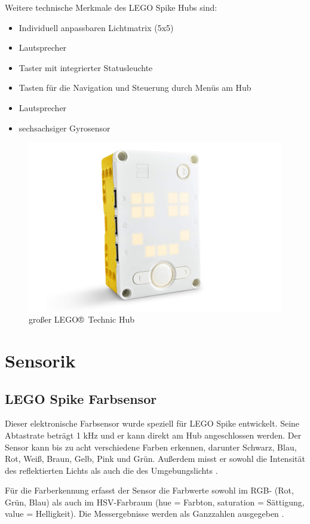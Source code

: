 Weitere technische Merkmale des LEGO Spike Hubs sind:
\begin{itemize}
	\item Individuell anpassbaren Lichtmatrix (5x5)
	\item Lautsprecher
	\item Taster mit integrierter Statusleuchte 
	\item Tasten für die Navigation und Steuerung durch Menüs am Hub 
	\item Lautsprecher
	\item sechsachsiger Gyrosensor 
\end{itemize} 

\begin{figure}[H]
	\centering
	\includegraphics[width=0.75\linewidth]{images/Hub}
	\caption{großer LEGO® Technic Hub}
	\label{fig:hub}
\end{figure}

\section{Sensorik}
\subsection{LEGO Spike Farbsensor}
Dieser elektronische Farbsensor wurde speziell für LEGO Spike entwickelt. Seine Abtastrate beträgt 1 kHz und er kann direkt am Hub angeschlossen werden. Der Sensor kann bis zu acht verschiedene Farben erkennen, darunter Schwarz, Blau, Rot, Weiß, Braun, Gelb, Pink und Grün. Außerdem misst er sowohl die Intensität des reflektierten Lichts als auch die des Umgebungslichts \autocite{lego2020colorsensor}\autocite{legoeducation2020spikesensors}.

Für die Farberkennung erfasst der Sensor die Farbwerte sowohl im RGB- (Rot, Grün, Blau) als auch im HSV-Farbraum (hue = Farbton, saturation = Sättigung, value = Helligkeit). Die Messergebnisse werden als Ganzzahlen ausgegeben \autocite{lego2020colorsensor}.

